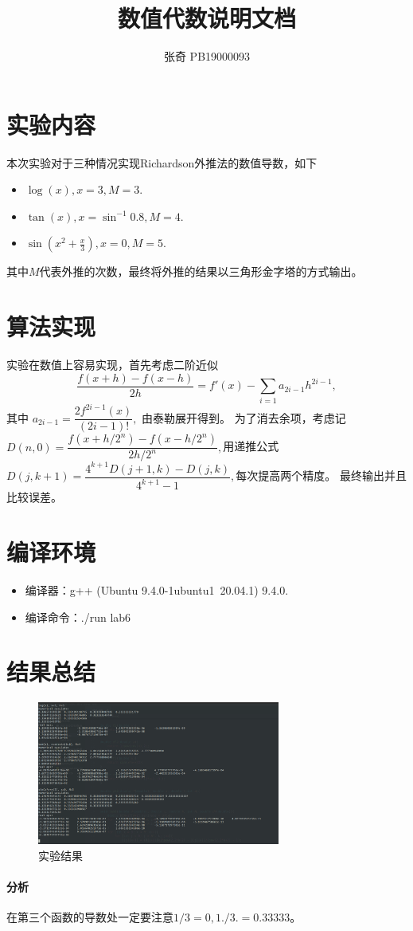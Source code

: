 \documentclass{article}
\title{数值代数说明文档}
\author{张奇 PB19000093}
\begin{document}
\begin{CJK}{UTF8}{gbsn}
    	\maketitle
    \section{实验内容}
    	本次实验对于三种情况实现Richardson外推法的数值导数，如下
    	\begin{itemize}
    		\item $\log(x), x=3, M=3.$
    		\item $\tan(x), x=\sin^{-1}0.8, M=4.$
    		\item $\sin(x^2+\frac{x}{3}), x=0, M=5.$
    	\end{itemize}
    	其中$M$代表外推的次数，最终将外推的结果以三角形金字塔的方式输出。
    \section{算法实现}
    	实验在数值上容易实现，首先考虑二阶近似
    	\[ \dfrac{f(x+h) - f(x-h)}{2h} = f'(x) - \sum_{i=1} a_{2i-1} h^{2i-1},\]
    	其中 $a_{2i-1} = \dfrac{2f^{2i-1}(x)}{(2i-1)!},$ 由泰勒展开得到。
    	为了消去余项，考虑记$D(n,0) = \dfrac{f(x+h/2^n) - f(x-h/2^n)}{2h/2^n},$用递推公式
    	$D(j,k+1) = \dfrac{4^{k+1} D(j+1,k) - D(j,k) }{4^{k+1} - 1},$每次提高两个精度。
    	最终输出并且比较误差。
    	\section{编译环境}
    	\begin{itemize}
    		\item 编译器：g++ (Ubuntu 9.4.0-1ubuntu1~20.04.1) 9.4.0.
    		\item 编译命令：./run  lab6
    	\end{itemize}
    \section{结果总结}
    \begin{figure}[hbpt]
    	\centering
    	\includegraphics[width=8cm]{./code4.png}
    	\caption{实验结果}
    \end{figure}
    \paragraph{分析}
  	在第三个函数的导数处一定要注意$1/3=0,1./3.=0.33333$。
\end{CJK}
\end{document}
